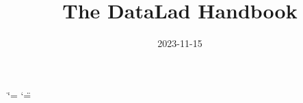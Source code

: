 \documentclass[letterpaper,10pt,english,twoside]{sphinxmanual}
\title{The DataLad Handbook}
\date{2023-11-15}
\author{}
\begin{document}
\ifdefined\shorthandoff
  \ifnum\catcode`\=\string=\active\shorthandoff{=}\fi
  \ifnum\catcode`\"=\active{}\fi
\fi

\pagestyle{empty}
\newcommand{\withauthors}{\mbox{Laura Waite}, \mbox{Kyle Meyer}, \mbox{Marisa Heckner}, \mbox{Benjamin Poldrack}, \mbox{Yaroslav Halchenko}, \mbox{Chris Markiewicz}, \mbox{Pattarawat Chormai}, \mbox{Lisa N. Mochalski}, \mbox{Lisa Wiersch}, \mbox{Jean-Baptiste Poline}, \mbox{Nevena Kraljevic}, \mbox{Alex Waite}, \mbox{Lya K. Paas}, \mbox{Niels Reuter}, \mbox{Peter Vavra}, \mbox{Tobias Kadelka}, \mbox{Peer Herholz}, \mbox{Alexandre Hutton}, \mbox{Sarah Oliveira}, \mbox{Dorian Pustina}, \mbox{Hamzah Hamid Baagil}, \mbox{Tristan Glatard}, \mbox{Giulia Ippoliti}, \mbox{Christian Mönch}, \mbox{Togaru Surya Teja}, \mbox{Dorien Huijser}, \mbox{Ariel Rokem}, \mbox{Remi Gau}, \mbox{Judith Bomba}, \mbox{Konrad Hinsen}, \mbox{Jianxiao Wu}, \mbox{Małgorzata Wierzba}, \mbox{Stefan Appelhoff}, \mbox{Michael Joseph}, \mbox{Tamara Cook}, \mbox{Stephan Heunis}, \mbox{Joerg Stadler}, \mbox{Sin Kim}, \mbox{Oscar Esteban}, \mbox{Michał Szczepanik}, \mbox{Eduard Ort}, \mbox{Myrskyta}, \mbox{Thomas Guiot}, \mbox{Julius Breuer}, \mbox{Ikko Ashimine}, \mbox{Arshitha Basavaraj}, \mbox{Anthony J Veltri}, \mbox{Isil Bilgin}, \mbox{Julian Kosciessa}, \mbox{Isaac To}, \mbox{Austin Macdonald}, \mbox{Christopher S. Hall}, \mbox{John C. Ford}, \mbox{Julien Colomb}, \mbox{Danny Garside}}

\pagestyle{plain}
\sphinxtableofcontents
\pagestyle{normal}
\label{\detokenize{book_main::doc}}


\mainmatter

 \fancyhead[LE]{\small\thepage}
 \fancyhead[RO]{\small\thepage}
 \fancyhead[RE]{\small\nouppercase{\leftmark}}
 \fancyhead[LO]{\small\nouppercase{\rightmark}}
 \fancyfoot{}
 \fancyfoot[LE]{}
 \renewcommand*{\footrule}{}%

\sphinxstepscope
\end{document}
